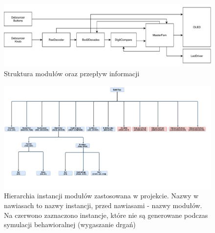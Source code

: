 \documentclass[12pt] {article}
\begin{document}
\begin{figure}[H]
\centering
\includegraphics[width=1.0\textwidth]{res/architektura-moduly.pdf}
\caption{Struktura modułów oraz przepływ informacji} 
\label{fig:swarch}
\end{figure}

\begin{landscape}
\begin{figure}[H]
\centering
\includegraphics[width=1.5\textwidth]{res/HDL_Hierarchy.pdf}
\caption{Hierarchia instancji modułów zastosowana w projekcie. Nazwy w nawiasach to nazwy instancji, przed nawiasami - nazwy modułów. Na czerwono zaznaczono instancje, które nie są generowane podczas symulacji behawioralnej (wygaszanie drgań)} 
\label{fig:hier}
\end{figure}
\end{landscape}
\end{document}
